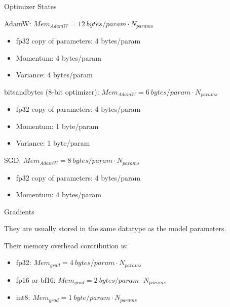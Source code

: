 
\begin{vbframe}{Optimizer States}

\vfill

AdamW: $Mem_{AdamW} = 12 ~bytes/param \cdot N_{params}$
\begin{itemize}
 	\item fp32 copy of parameters: 4 bytes/param
 	\item Momentum: 4 bytes/param
	\item Variance: 4 bytes/param
\end{itemize}

\vskip3mm

bitsandbytes (8-bit optimizer): $Mem_{AdamW} = 6 ~bytes/param \cdot N_{params}$
\begin{itemize}
 	\item fp32 copy of parameters: 4 bytes/param
 	\item Momentum: 1 byte/param
	\item Variance: 1 byte/param
\end{itemize}

\vskip3mm

SGD: $Mem_{AdamW} = 8 ~bytes/param \cdot N_{params}$
\begin{itemize}
 	\item fp32 copy of parameters: 4 bytes/param
 	\item Momentum: 4 bytes/param
\end{itemize}

\vfill

\end{vbframe}


\begin{vbframe}{Gradients}

\vfill

They are usually stored in the same datatype as the model parameters. \newline

Their memory overhead contribution is: \newline

\begin{itemize}
 	\item fp32: $Mem_{grad} = 4 ~bytes/param \cdot N_{params}$
 	\item fp16 or bf16: $Mem_{grad} = 2 ~bytes/param \cdot N_{params}$
	\item int8: $Mem_{grad} = 1 ~byte/param \cdot N_{params}$
\end{itemize}

\vfill

\end{vbframe}

